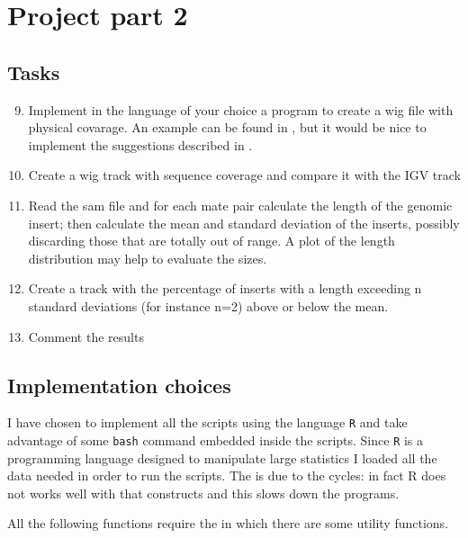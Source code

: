 \newcommand{\scriptusage}{\\Run \texttt{Rscript main.R --help} for more details
on script usage.}

\chapter{Project part 2}\label{chp:part2}
\section{Tasks}
\begin{enumerate}
\setcounter{enumi}{8}

\item Implement in the language of your choice a program to create a wig file
with physical covarage. An example can be found in , but it
would be nice to implement the suggestions described in 
.
\label{itm:2.9}

\item Create a wig track with sequence coverage and compare it with the IGV
track\label{itm:2.10}

\item Read the sam file and for each mate pair calculate the length of the
genomic insert; then calculate the mean and standard deviation of the inserts,
possibly discarding those that are totally out of range. A plot of the length
distribution may help to evaluate the sizes.
\label{itm:2.11}

\item Create a track with the percentage of inserts with a length exceeding n
standard deviations (for instance n=2) above or below the mean.
\label{itm:2.12}

\item Comment the results
\label{itm:2.13}
\end{enumerate}
\section{Implementation choices}
I have chosen to implement all the scripts using the language \texttt{R} and
take advantage of some \texttt{bash} command embedded inside the scripts. Since
\texttt{R} is a programming language designed to manipulate large statistics I
loaded all the data needed in order to run the scripts. The is due to the
cycles: in fact R does not works well with that constructs and this slows down
the programs.

All the following functions require the  in which there are some
utility functions.


